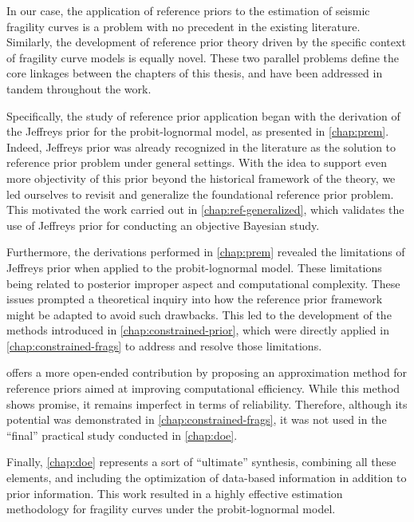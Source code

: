 In our case, the application of reference priors to the estimation of seismic fragility curves is a problem with no precedent in the existing literature. Similarly, the development of reference prior theory driven by the specific context of fragility curve models is equally novel. These two parallel problems define the core linkages between the chapters of this thesis, and have been addressed in tandem throughout the work.

Specifically, the study of reference prior application began with the derivation of the Jeffreys prior for the probit-lognormal model, as presented in \cref{chap:prem}. Indeed, Jeffreys prior was already recognized in the literature as the solution to reference prior problem under general settings. With the idea to support even more
 objectivity of this prior beyond the historical framework of the theory, we led ourselves to revisit and generalize the foundational reference prior problem. This motivated the work carried out in \cref{chap:ref-generalized}, which validates the use of Jeffreys prior for conducting an objective Bayesian study. %

Furthermore, the derivations performed in \cref{chap:prem} revealed the limitations of Jeffreys prior when applied to the probit-lognormal model. These limitations being related to posterior improper aspect and computational complexity. 
These issues prompted a theoretical inquiry into how the reference prior framework might be adapted to avoid such drawbacks. This led to the development of the methods introduced in \cref{chap:constrained-prior}, which were directly applied in \cref{chap:constrained-frags} to address and resolve those limitations.


 offers a more open-ended contribution by proposing an approximation method for reference priors aimed at improving computational efficiency. While this method shows promise, it remains imperfect in terms of reliability. Therefore, although its potential was demonstrated in \cref{chap:constrained-frags}, it was not used in the ``final'' practical study conducted in \cref{chap:doe}.


Finally, \cref{chap:doe} represents a sort of ``ultimate'' synthesis, combining all these elements, and including the optimization of data-based information in addition to prior information. This work resulted in a highly effective estimation methodology for fragility curves under the probit-lognormal model.



